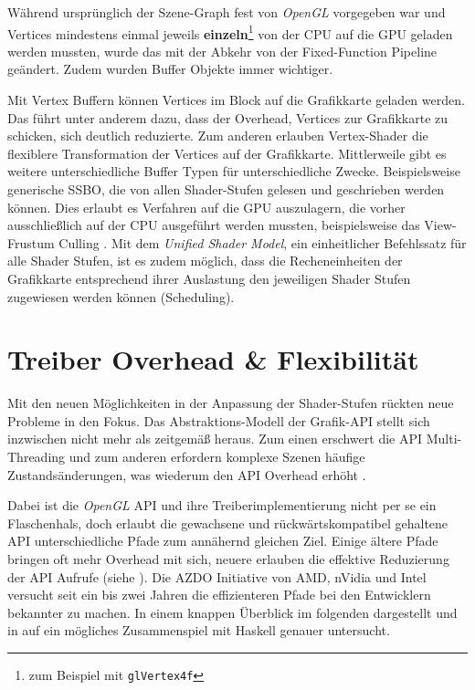Während ursprünglich der Szene-Graph fest von \textit{OpenGL} vorgegeben war und Vertices mindestens einmal jeweils \textbf{einzeln}\footnote{ zum Beispiel mit \texttt{glVertex4f}} von der CPU auf die GPU geladen werden mussten, wurde das mit der Abkehr von der Fixed-Function Pipeline geändert. Zudem wurden Buffer Objekte immer wichtiger.

Mit Vertex Buffern können Vertices im Block auf die Grafikkarte geladen werden. Das führt unter anderem dazu, dass der Overhead, Vertices zur Grafikkarte zu schicken, sich deutlich reduzierte. Zum anderen erlauben Vertex-Shader die flexiblere Transformation der Vertices auf der Grafikkarte. Mittlerweile gibt es weitere unterschiedliche Buffer Typen für unterschiedliche Zwecke. Beispielsweise generische \acf{SSBO}, die von allen Shader-Stufen gelesen und geschrieben werden können. Dies erlaubt es Verfahren auf die GPU auszulagern, die vorher ausschließlich auf der CPU ausgeführt werden mussten, beispielsweise das View-Frustum Culling \parencite{Barczak2008}. Mit dem \textit{Unified Shader Model}, ein einheitlicher Befehlssatz für alle Shader Stufen, ist es zudem möglich, dass die Recheneinheiten der Grafikkarte entsprechend ihrer Auslastung den jeweiligen Shader Stufen zugewiesen werden können (Scheduling).

\section{Treiber Overhead \& Flexibilität}
\label{sec:overhead-und-flexibilitaet}

Mit den neuen Möglichkeiten in der Anpassung der Shader-Stufen rückten neue Probleme in den Fokus. Das Abstraktions-Modell der Grafik-\ac{API} stellt sich inzwischen nicht mehr als zeitgemäß heraus. Zum einen erschwert die \ac{API} Multi-Threading und zum anderen erfordern komplexe Szenen häufige Zustandsänderungen, was wiederum den \ac{API} Overhead erhöht \parencite[Seite 8]{Everitt2014a}.

Dabei ist die \textit{OpenGL} API und ihre Treiberimplementierung nicht per se ein Flaschenhals, doch erlaubt die gewachsene und rückwärtskompatibel gehaltene API unterschiedliche Pfade zum annähernd gleichen Ziel. Einige ältere Pfade bringen oft mehr Overhead mit sich, neuere erlauben die effektive Reduzierung der API Aufrufe (siehe ). Die \ac{AZDO} Initiative von AMD, nVidia und Intel versucht seit ein bis zwei Jahren die effizienteren Pfade bei den Entwicklern bekannter zu machen. In einem knappen Überblick im folgenden dargestellt und in  auf ein mögliches Zusammenspiel mit Haskell genauer untersucht.

